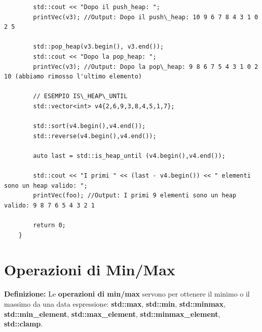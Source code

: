 \begin{lstlisting}
		std::cout << "Dopo il push_heap: ";
		printVec(v3); //Output: Dopo il push\_heap: 10 9 6 7 8 4 3 1 0 2 5
		
		std::pop_heap(v3.begin(), v3.end());
		std::cout << "Dopo la pop_heap: ";
		printVec(v3); //Output: Dopo la pop\_heap: 9 8 6 7 5 4 3 1 0 2 10 (abbiamo rimosso l'ultimo elemento)
		
		// ESEMPIO IS\_HEAP\_UNTIL
		std::vector<int> v4{2,6,9,3,8,4,5,1,7};
		
		std::sort(v4.begin(),v4.end());
		std::reverse(v4.begin(),v4.end());
		
		auto last = std::is_heap_until (v4.begin(),v4.end());
		
		std::cout << "I primi " << (last - v4.begin()) << " elementi sono un heap valido: ";
		printVec(foo); //Output: I primi 9 elementi sono un heap valido: 9 8 7 6 5 4 3 2 1
		
		return 0;
	}
\end{lstlisting}


\newpage

\section{Operazioni di Min/Max}

\textsf{\small \textbf{Definizione: } Le \textbf{operazioni di min/max} servono per ottenere il minimo o il massimo da una data espressione: \textbf{std::max}, \textbf{std::min}, \textbf{std::minmax}, \textbf{std::min\_element}, \textbf{std::max\_element}, \textbf{std::minmax\_element}, \textbf{std::clamp}.} \\

